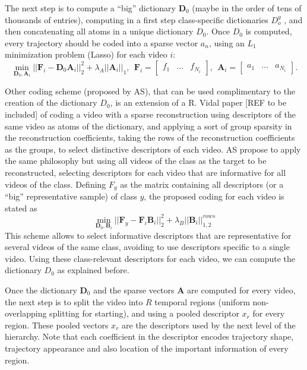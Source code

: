 \documentclass[10pt,letterpaper]{article}
\newcommand{\+}[1]{\ensuremath{{\boldsymbol #1}}}
\begin{document}
The next step is to compute a ``big'' dictionary $\+D_0$ (maybe in the order of tens of thousands of entries), computing in a first step class-specific dictionaries $D_o^y$ , and then concatenating all atoms in a unique dictionary $D_0$. Once $D_0$ is computed, every trajectory should be coded into a sparse vector $a_{n}$, using an $L_1$ minimization problem (Lasso) for each video $i$:
\begin{equation}
\min_{\+D_0,\+A_i} ||\+F_i - \+D_0 \+A_i||_2^2+\lambda_A ||\+A_i||_1,~~ \+F_i=[\begin{matrix} f_1 & \dots & f_{N_i} \end{matrix}],~~\+A_i =[\begin{matrix} a_1 & \dots & a_{N_i} \end{matrix}].
\end{equation}

Other coding scheme (proposed by AS), that can be used complimentary to the creation of the dictionary $D_0$, is an extension of a R. Vidal paper [REF to be included] of coding a video with a sparse reconstruction using descriptors of the same video as atoms of the dictionary, and applying a sort of group sparsity in the reconstruction coefficients, taking the rows of the reconstruction coefficients as the groups, to select distinctive descriptors of each video. AS propose to apply the same philosophy but using all videos of the class as the target to be reconstructed, selecting descriptors for each video that are informative for all videos of the class. Defining $F_y$ as the matrix containing all descriptors (or a ``big'' representative sample) of class $y$, the proposed coding for each video is stated as
\begin{equation}
\min_{\+D_0,\+B_i} ||\+F_y - \+F_i\+B_i||_2^2+\lambda_{B} ||\+B_i||_{1,2}^{rows}
\end{equation}
This scheme allows to select informative descriptors that are representative for several videos of the same class, avoiding to use descriptors specific to a single video. Using these class-relevant descriptors for each video, we can compute the dictionary $D_0$ as explained before. 

Once the dictionary $\+D_0$ and the sparse vectors $\+A$ are computed for every video,  the next step  is to split the video into $R$ temporal regions (uniform non-overlapping splitting for starting), and using a pooled descriptor $x_r$ for every region. These pooled vectors $x_r$ are the descriptors used by the next level of the hierarchy. Note that each coefficient in the descriptor encodes trajectory shape, trajectory appearance and also location of the important information of every region.
\end{document}
